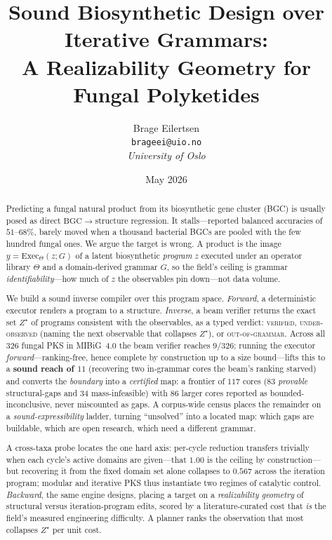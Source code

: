 \documentclass[11pt]{article}
\title{\textbf{Sound Biosynthetic Design over Iterative Grammars:\\A Realizability Geometry for Fungal Polyketides}}
\author{Brage Eilertsen\\
\small \texttt{brageei@uio.no}\\
\small \textit{University of Oslo}}
\date{May 2026}
\theoremstyle{definition}
\begin{document}
\maketitle

\begin{abstract}
Predicting a fungal natural product from its biosynthetic gene cluster (BGC) is usually posed as
direct $\mathrm{BGC}\!\to\!$structure regression. It stalls---reported balanced accuracies of
$51$--$68\%$, barely moved when a thousand bacterial BGCs are pooled with the few hundred fungal
ones. We argue the target is wrong. A product is the image $y=\mathrm{Exec}_{\Theta}(z;G)$ of a
latent biosynthetic \emph{program} $z$ executed under an operator library $\Theta$ and a
domain-derived grammar $G$, so the field's ceiling is grammar \emph{identifiability}---how much of
$z$ the observables pin down---not data volume.

We build a sound inverse compiler over this program space. \emph{Forward}, a deterministic executor
renders a program to a structure. \emph{Inverse}, a beam verifier returns the exact set $Z^\star$ of
programs consistent with the observables, as a typed verdict: \textsc{verified},
\textsc{under-observed} (naming the next observable that collapses $Z^\star$), or
\textsc{out-of-grammar}. Across all $326$ fungal PKS in MIBiG~4.0 the beam verifier reaches $9/326$; running the executor
\emph{forward}---ranking-free, hence complete by construction up to a size bound---lifts this to a
\textbf{sound reach of $11$} (recovering two in-grammar cores the beam's ranking starved) and converts
the \emph{boundary} into a \emph{certified} map: a frontier of $117$ cores ($83$ \emph{provable}
structural-gaps and $34$ mass-infeasible) with $86$ larger cores reported as bounded-inconclusive, never
miscounted as gaps. A corpus-wide census places the remainder on a \emph{sound-expressibility} ladder,
turning ``unsolved'' into a located map: which gaps are buildable, which are open research, which need a
different grammar.

A cross-taxa probe locates the one hard axis: per-cycle reduction transfers trivially when each
cycle's active domains are given---that $1.00$ is the ceiling by construction---but recovering it
from the fixed domain set alone collapses to $0.567$ across the iteration program; modular and
iterative PKS thus instantiate two regimes of catalytic control. \emph{Backward}, the same engine
designs, placing a target on a \emph{realizability geometry} of structural versus iteration-program
edits, scored by a literature-curated cost that \emph{is} the field's measured engineering
difficulty. A planner ranks the observation that most collapses $Z^\star$ per unit cost.


\end{abstract}
\end{document}

